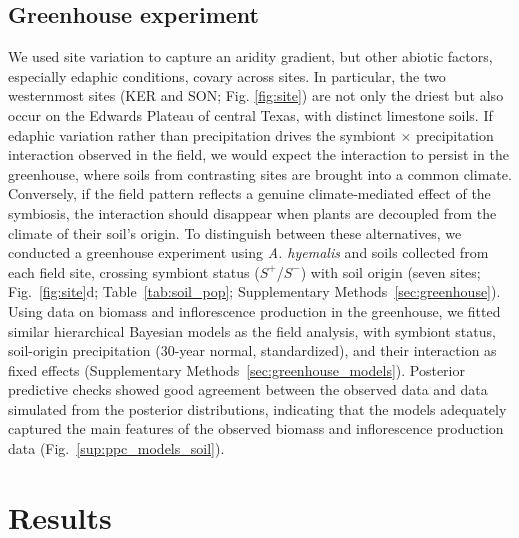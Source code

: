 \documentclass[12pt]{article}\usepackage[]{graphicx}\usepackage[dvipsnames]{xcolor}
\begin{document}
\subsection*{Greenhouse experiment}
We used site variation to capture an aridity gradient, but other abiotic factors, especially edaphic conditions, covary across sites. 
In particular, the two westernmost sites (KER and SON; Fig. \ref{fig:site}) are not only the driest but also occur on the Edwards Plateau of central Texas, with distinct limestone soils.
If edaphic variation rather than precipitation drives the symbiont $\times$ precipitation interaction observed in the field, we would expect the interaction to persist in the greenhouse, where soils from contrasting sites are brought into a common climate. 
Conversely, if the field pattern reflects a genuine climate-mediated effect of the symbiosis, the interaction should disappear when plants are decoupled from the climate of their soil's origin. 
To distinguish between these alternatives, we conducted a greenhouse experiment using \textit{A. hyemalis} and soils collected from each field site, crossing symbiont status ($S^+$/$S^-$) with soil origin (seven sites; Fig.~\ref{fig:site}d; 
Table~\ref{tab:soil_pop}; Supplementary Methods~\ref{sec:greenhouse}).
Using data on biomass and inflorescence production in the greenhouse, we fitted similar hierarchical Bayesian models as the field analysis, with symbiont status, soil-origin precipitation (30-year normal, standardized), and their interaction as fixed effects (Supplementary Methods~\ref{sec:greenhouse_models}).
Posterior predictive checks showed good agreement between the observed data and data simulated from the posterior distributions, indicating that the models adequately captured the main features of the observed biomass and inflorescence production data (Fig.~\ref{sup:ppc_models_soil}).

\section*{Results}
\end{document}
